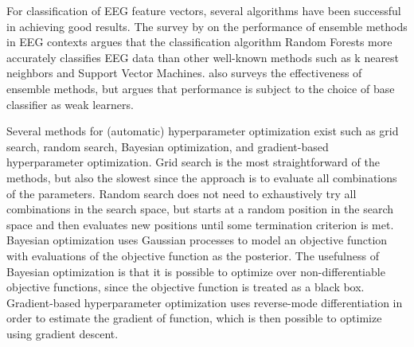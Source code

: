 For classification of EEG feature vectors, several algorithms have been successful in achieving good results. The survey by \citet{chan2015systematic} on the performance of ensemble methods in EEG contexts argues that the classification algorithm Random Forests more accurately classifies EEG data than other well-known methods such as k nearest neighbors and Support Vector Machines. \citet{sun2007experimental} also surveys the effectiveness of ensemble methods, but argues that performance is subject to the choice of base classifier as weak learners. 

Several methods for (automatic) hyperparameter optimization exist such as grid search, random search, Bayesian optimization, and gradient-based hyperparameter optimization. Grid search is the most straightforward of the methods, but also the slowest since the approach is to evaluate all combinations of the parameters. Random search does not need to exhaustively try all combinations in the search space, but starts at a random position in the search space and then evaluates new positions until some termination criterion is met. Bayesian optimization uses Gaussian processes to model an objective function with evaluations of the objective function as the posterior. The usefulness of Bayesian optimization is that it is possible to optimize over non-differentiable objective functions, since the objective function is treated as a black box. Gradient-based hyperparameter optimization uses reverse-mode differentiation in order to estimate the gradient of function, which is then possible to optimize using gradient descent.



